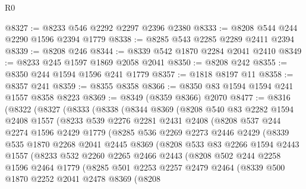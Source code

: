 \begin{lexlean}{R0}
\begin{coremodule}
@8327 := @8233 @546 @2292 @2297 @2396 @2380
@8333 := @8208 @544 @244 @2290 @1596 @2394 @1779
@8338 := @8285 @543 @2285 @2289 @2411 @2394
@8339 := @8208 @246
@8344 := @8339 @542 @1870 @2284 @2041 @2410
@8349 := @8233 @245 @1597 @1869 @2058 @2041
@8350 := @8208 @242
@8355 := @8350 @244 @1594 @1596 @241 @1779
@8357 := @1818 @8197 @11
@8358 := @8357 @241
@8359 := @8355 @8358
@8366 := @8350 @83 @1594 @1594 @241 @1557 @8358 @8223
@8369 := @8349 (@8359 @8366) @2070
@8477 := @8316
    (@8322
      (@8327
        (@8333
          (@8338
            (@8344
              @8369
              (@8208
                @540
                @83
                @2282
                @1594
                @2408
                @1557
                (@8233
                  @539
                  @2276
                  @2281
                  @2431
                  @2408
                  (@8208
                    @537
                    @244
                    @2274
                    @1596
                    @2429
                    @1779
                    (@8285
                      @536
                      @2269
                      @2273
                      @2446
                      @2429
                      (@8339
                        @535
                        @1870
                        @2268
                        @2041
                        @2445
                        @8369
                        (@8208
                          @533
                          @83
                          @2266
                          @1594
                          @2443
                          @1557
                          (@8233
                            @532
                            @2260
                            @2265
                            @2466
                            @2443
                            (@8208
                              @502
                              @244
                              @2258
                              @1596
                              @2464
                              @1779
                              (@8285
                                @501
                                @2253
                                @2257
                                @2479
                                @2464
                                (@8339
                                  @500
                                  @1870
                                  @2252
                                  @2041
                                  @2478
                                  @8369
                                  (@8208

\end{coremodule}
\end{lexlean}
